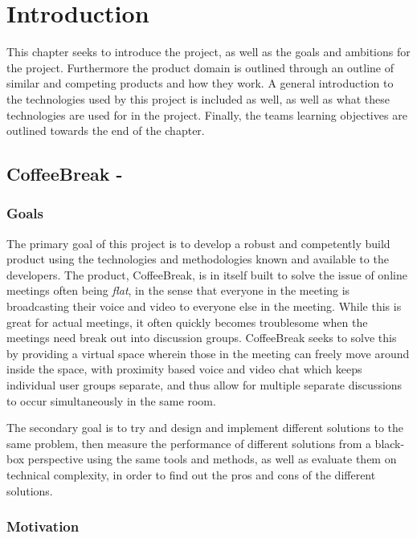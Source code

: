 \chapter{Introduction}

This chapter seeks to introduce the project, as well as the goals and ambitions for the project. Furthermore the product domain is outlined through an outline of similar and competing products and how they work. A general introduction to the technologies used by this project is included as well, as well as what these technologies are used for in the project. Finally, the teams learning objectives are outlined towards the end of the chapter.

\section{CoffeeBreak - \thesissubtitle}

\subsection{Goals}

The primary goal of this project is to develop a robust and competently build product using the technologies and methodologies known and available to the developers. The product, CoffeeBreak, is in itself built to solve the issue of online meetings often being \textit{flat}, in the sense that everyone in the meeting is broadcasting their voice and video to everyone else in the meeting. While this is great for actual meetings, it often quickly becomes troublesome when the meetings need break out into discussion groups. CoffeeBreak seeks to solve this by providing a virtual space wherein those in the meeting can freely move around inside the space, with proximity based voice and video chat which keeps individual user groups separate, and thus allow for multiple separate discussions to occur simultaneously in the same room.

The secondary goal is to try and design and implement different solutions to the same problem, then measure the performance of different solutions from a black-box perspective using the same tools and methods, as well as evaluate them on technical complexity, in order to find out the pros and cons of the different solutions.

\subsection{Motivation}

